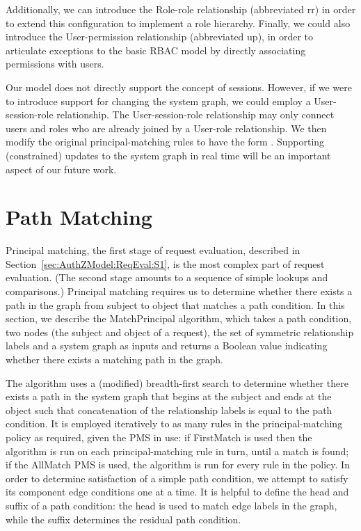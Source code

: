 \documentclass{article}
\begin{document}
Additionally, we can introduce the \textsf{Role-role} relationship (abbreviated \textsf{rr}) in order to extend this configuration to implement a role hierarchy.
Finally, we could also introduce the \textsf{User-permission} relationship (abbreviated \textsf{up}), in order to articulate exceptions to the basic RBAC model by directly associating permissions with users.

Our model does not directly support the concept of sessions.
However, if we were to introduce support for changing the system graph, we could employ a \textsf{User-session-role} relationship.
The \textsf{User-session-role} relationship may only connect users and roles who are already joined by a \textsf{User-role} relationship.
We then modify the original principal-matching rules to have the form .
Supporting (constrained) updates to the system graph in real time will be an important aspect of our future work.

\section{Path Matching}\label{sec:Algorithm}
Principal matching, the first stage of request evaluation, described in Section~\ref{sec:AuthZModel:ReqEval:S1}, is the most complex part of request evaluation.
(The second stage amounts to a sequence of simple lookups and comparisons.)
Principal matching requires us to determine whether there exists a path in the graph from subject to object that matches a path condition.
In this section, we describe the \textsf{MatchPrincipal} algorithm, which takes a path condition, two nodes (the subject and object of a request), the set of symmetric relationship labels and a system graph as inputs and returns a Boolean value indicating whether there exists a matching path in the graph.

The algorithm uses a (modified) breadth-first search to determine whether there exists a path in the system graph that begins at the subject and ends at the object such that concatenation of the relationship labels is equal to the path condition.
It is employed iteratively to as many rules in the principal-matching policy as required, given the PMS in use: if \textsf{FirstMatch} is used then the algorithm is run on each principal-matching rule in turn, until a match is found; if the \textsf{AllMatch} PMS is used, the algorithm is run for every rule in the policy.
In order to determine satisfaction of a simple path condition, we attempt to satisfy its component edge conditions one at a time.
It is helpful to define the head and suffix of a path condition: the head is used to match edge labels in the graph, while the suffix determines the residual path condition.
\end{document}
